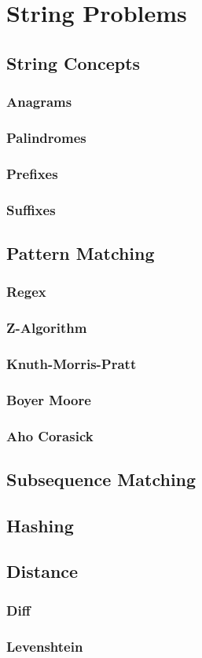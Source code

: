 \section{String Problems}
\subsection{String Concepts}
\subsubsection{Anagrams}
\subsubsection{Palindromes}
\subsubsection{Prefixes}
\subsubsection{Suffixes}
\subsection{Pattern Matching}
\subsubsection{Regex}
\subsubsection{Z-Algorithm}
\subsubsection{Knuth-Morris-Pratt}
\subsubsection{Boyer Moore}
\subsubsection{Aho Corasick}
\subsection{Subsequence Matching}
\subsection{Hashing}
\subsection{Distance}
\subsubsection{Diff}
\subsubsection{Levenshtein}